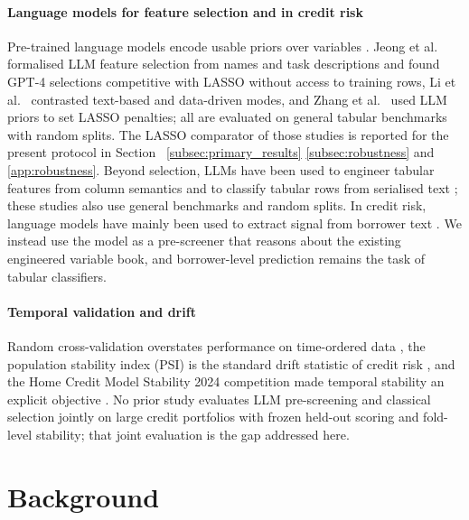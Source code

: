 \documentclass[final,5p,twocolumn]{elsarticle}
\providecommand{\DIFaddtex}[1]{{\protect\color{blue} \sf #1}} %
\providecommand{\DIFdeltex}[1]{{\protect\color{red} \scriptsize #1}} %
\providecommand{\DIFaddbegin}{} %
\providecommand{\DIFaddend}{} %
\providecommand{\DIFdelbegin}{} %
\providecommand{\DIFdelend}{} %
\providecommand{\DIFadd}[1]{\texorpdfstring{\DIFaddtex{#1}}{#1}} %
\providecommand{\DIFdel}[1]{\texorpdfstring{\DIFdeltex{#1}}{}} %
\begin{document}
\paragraph{Language models for feature selection and in credit risk}
Pre-trained language models encode usable priors over variables \cite{choi2022}. Jeong et al.\ \cite{jeong2025} formalised LLM feature selection from names and task descriptions and found GPT-4 selections competitive with LASSO without access to training rows, Li et al.\ \cite{li2025sigkdd} contrasted text-based and data-driven modes, and Zhang et al.\ \cite{zhang2025llmlasso} used LLM priors to set LASSO penalties; all are evaluated on general tabular benchmarks with random splits. The LASSO comparator of those studies is reported for the present protocol in Section~\DIFdelbegin \DIFdel{\ref{subsec:primary_results}}\DIFdelend \DIFaddbegin \DIFadd{\ref{subsec:robustness} and \ref{app:robustness}}\DIFaddend . Beyond selection, LLMs have been used to engineer tabular features from column semantics \cite{hollmann2023caafe,han2024llmfe,nam2024octree} and to classify tabular rows from serialised text \cite{hegselmann2023tabllm}; these studies also use general benchmarks and random splits. In credit risk, language models have mainly been used to extract signal from borrower text \cite{sanzguerrero2025,xia2025}. We instead use the model as a pre-screener that reasons about the existing engineered variable book, and borrower-level prediction remains the task of tabular classifiers.

\paragraph{Temporal validation and drift}
Random cross-validation overstates performance on time-ordered data \cite{bergmeir2012,gama2014}, the population stability index (PSI) is the standard drift statistic of credit risk \cite{yurdakul2020}, and the Home Credit Model Stability 2024 competition made temporal stability an explicit objective \cite{homecredit2024}. No prior study evaluates LLM pre-screening and classical selection jointly on large credit portfolios with frozen held-out scoring and fold-level stability; that joint evaluation is the gap addressed here.


\section{Background}
\label{sec:background}
\end{document}
